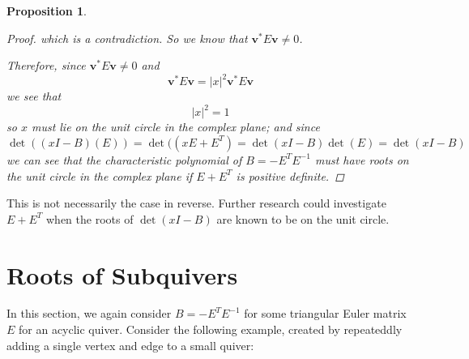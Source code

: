 \documentclass{amsart}
\theoremstyle{theorem}
\theoremstyle{theorem*}
\newtheorem{proposition}[theorem]{Proposition}
\theoremstyle{definition}
\begin{document}
\begin{proposition}
\begin{proof}
        which is a contradiction. So we know that
        $\textbf{v}^* E \textbf{v} \neq 0$.

        Therefore, since $\textbf{v}^* E \textbf{v} \neq 0$ and
        $$\textbf{v}^* E \textbf{v} = |x|^2 \textbf{v}^* E \textbf{v}$$
        we see that
        $$|x|^2 = 1$$
        so $x$ must lie on the unit circle in the complex plane; and since
        $$\det((xI - B)(E)) = \det((xE + E^T) =
            \det(xI - B)\det(E) = \det(xI - B)$$
        we can see that the characteristic polynomial
        of $B = -E^T E^{-1}$ must have roots on the unit circle
        in the complex plane if $E + E^T$ is positive definite.
    \end{proof}
\end{proposition}

This is not necessarily the case in reverse. Further research could investigate
$E + E^T$ when the roots of $\det(xI - B)$ are known to be on the unit circle.

\section{Roots of Subquivers}

In this section, we again consider $B = - E^T E^{-1}$ for some
triangular Euler matrix $E$ for an acyclic quiver. Consider the following
example, created by repeateddly adding a single vertex and edge to a small
quiver:
\end{document}

